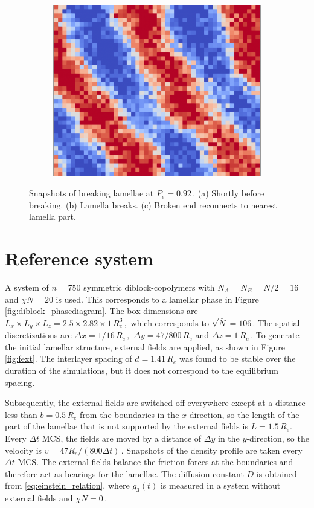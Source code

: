 \documentclass[bachelor,       %
               twoside,        %
               BCOR10mm,       %
               ngerman, english %
               ]{GAUBM}
\begin{document}
\begin{figure}[h]
  \hfill
    \begin{subfigure}[b]{0.3\textwidth}
      \centering
      \includegraphics[width=\textwidth]{figures/lamella_t3.png}
      \caption{}
      \label{fig:lamella_t3}
  \end{subfigure}
     \caption{Snapshots of breaking lamellae at $P_e=0.92\,.$ (a) Shortly before breaking. (b) Lamella breaks. (c) Broken end reconnects to nearest lamella part.}
     \label{fig:lamella_break}
\end{figure}


\section{Reference system}
A system of $n=750$ symmetric diblock-copolymers with $N_A=N_B=N/2=16$ and $\chi N=20$ is used. This corresponds to a lamellar phase in Figure \ref{fig:diblock_phasediagram}. The box dimensions are $L_x\times L_y\times L_z=2.5\times2.82\times1\,R_e^3\,,$ which corresponds to $\sqrt{\bar{N}}=106\,.$ The spatial discretizations are $\Delta x=1/16\,R_e\,,$ $\Delta y=47/800\,R_e$ and $\Delta z=1\,R_e\,.$ To generate the initial lamellar structure, external fields are applied, as shown in Figure \ref{fig:fext}. The interlayer spacing of $d=1.41\,R_e$ was found to be stable over the duration of the simulations, but it does not correspond to the equilibrium spacing.

Subsequently, the external fields are switched off everywhere except at a distance less than $b=0.5\,R_e$ from the boundaries in the $x$-direction, so the length of the part of the lamellae that is not supported by the external fields is $L=1.5\,R_e$. Every $\Delta t$ MCS, the fields are moved by a distance of $\Delta y$ in the $y$-direction, so the velocity is $v=47R_e/(800\Delta t)\,.$ Snapshots of the density profile are taken every $\Delta t$ MCS. The external fields balance the friction forces at the boundaries and therefore act as bearings for the lamellae. The diffusion constant $D$ is obtained from \eqref{eq:einstein_relation}, where $g_3(t)$ is measured in a system without external fields and $\chi N=0\,.$
\end{document}
